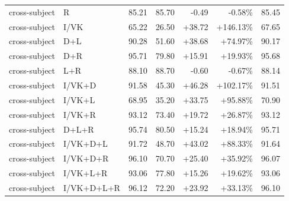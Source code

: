 \documentclass[UTF8,10pt,a4paper]{ctexart}
\newcommand{\better}[1]{\textcolor{ImpBlue}{#1}}
\newcommand{\worse}[1]{\textcolor{DropRed}{#1}}
\begin{document}
{\begin{longtable}{llrrrrr}
cross-subject & R & 85.21 & 85.70 & \worse{-0.49} & \worse{-0.58\%} & 85.45\\
cross-subject & I/VK & 65.22 & 26.50 & \better{+38.72} & \better{+146.13\%} & 67.65\\
cross-subject & D+L & 90.28 & 51.60 & \better{+38.68} & \better{+74.97\%} & 90.17\\
cross-subject & D+R & 95.71 & 79.80 & \better{+15.91} & \better{+19.93\%} & 95.68\\
cross-subject & L+R & 88.10 & 88.70 & \worse{-0.60} & \worse{-0.67\%} & 88.14\\
cross-subject & I/VK+D & 91.58 & 45.30 & \better{+46.28} & \better{+102.17\%} & 91.51\\
cross-subject & I/VK+L & 68.95 & 35.20 & \better{+33.75} & \better{+95.88\%} & 70.90\\
cross-subject & I/VK+R & 93.12 & 73.40 & \better{+19.72} & \better{+26.87\%} & 93.12\\
cross-subject & D+L+R & 95.74 & 80.50 & \better{+15.24} & \better{+18.94\%} & 95.71\\
cross-subject & I/VK+D+L & 91.72 & 48.70 & \better{+43.02} & \better{+88.33\%} & 91.64\\
cross-subject & I/VK+D+R & 96.10 & 70.70 & \better{+25.40} & \better{+35.92\%} & 96.07\\
cross-subject & I/VK+L+R & 93.06 & 77.80 & \better{+15.26} & \better{+19.62\%} & 93.06\\
cross-subject & I/VK+D+L+R & 96.12 & 72.20 & \better{+23.92} & \better{+33.13\%} & 96.10\\
\bottomrule
\end{longtable}
}
\end{document}
